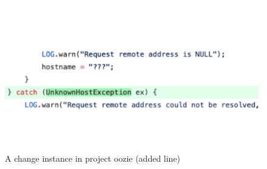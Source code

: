 \begin{figure}[!ht]
    \renewcommand{\arraystretch}{1}
    \centering
    \includegraphics[width=0.8\linewidth]{figures/string_4.pdf}\hfill
    \caption{A change instance in project oozie (added line)}
    \label{fig:string_4}
\end{figure}